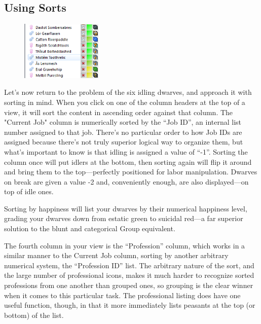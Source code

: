 \documentclass[]{article}
\begin{document}
\subsection{Using Sorts}
\label{sec:Using Sorts}
\begin{figure}
\vspace{-20pt}
  \begin{center}
    \includegraphics[width=0.35\textwidth]{Sec2Fig10}
  \end{center}
\vspace{-10pt}
\end{figure}
Let's now return to the problem of the six idling dwarves, and approach it with sorting in mind. When you
click on one of the column headers at the top of a view, it will sort the content in ascending order
against that column. The "Current Job" column is numerically sorted by the ``Job ID'', an internal list
number assigned to that job. There's no particular order to how Job IDs are assigned because there's not
truly superior logical way to organize them, but what's important to know is that idling is assigned a
value of ``-1''. Sorting the column once will put idlers at the bottom, then sorting again will flip it
around and bring them to the top---perfectly positioned for labor manipulation. Dwarves on break are
given a value -2 and, conveniently enough, are also displayed---on top of idle ones.

Sorting by happiness will list your dwarves by their numerical happiness level, grading your dwarves
down from estatic green to suicidal red---a far superior solution to the blunt and categorical Group
equivalent.

The fourth column in your view is the ``Profession'' column, which works in a similar manner to the
Current Job column, sorting by another arbitrary numerical system, the ``Profession ID'' list. The
arbitrary nature of the sort, and the large number of professional icons, makes it much harder to
recognize sorted professions from one another than grouped ones, so grouping is the clear winner when it
comes to this particular task. The professional listing does have one useful function, though, in that
it more immediately lists peasants at the top (or bottom) of the list.
\end{document}
